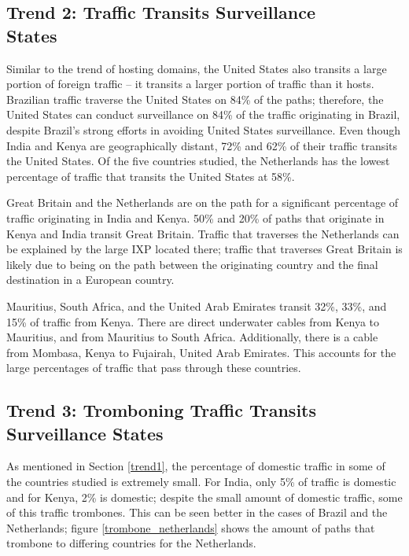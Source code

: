 \subsection{Trend 2: Traffic Transits Surveillance \\States}
Similar to the trend of hosting domains, the United States also transits a large portion of foreign traffic -- it transits a larger portion of traffic than it hosts.  Brazilian traffic traverse the United States on 84\% of the paths; therefore, the United States can conduct surveillance on 84\% of the traffic originating in Brazil, despite Brazil's strong efforts in avoiding United States surveillance.  Even though India and Kenya are geographically distant, 72\% and 62\% of their traffic transits the United States.  Of the five countries studied, the Netherlands has the lowest percentage of traffic that transits the United States at 58\%.  

Great Britain and the Netherlands are on the path for a significant percentage of traffic originating in India and Kenya.  50\% and 20\% of paths that originate in Kenya and India transit Great Britain.  Traffic that traverses the Netherlands can be explained by the large IXP located there; traffic that traverses Great Britain is likely due to being on the path between the originating country and the final destination in a European country.

Mauritius, South Africa, and the United Arab Emirates transit 32\%, 33\%, and 15\% of traffic from Kenya.  There are direct underwater cables from Kenya to Mauritius, and from Mauritius to South Africa.  Additionally, there is a cable from Mombasa, Kenya to Fujairah, United Arab Emirates.  This accounts for the large percentages of traffic that pass through these countries.

\subsection{Trend 3: Tromboning Traffic Transits \\Surveillance States}

As mentioned in Section \ref{trend1}, the percentage of domestic traffic in some of the countries studied is extremely small.  For India, only 5\% of traffic is domestic and for Kenya, 2\% is domestic; despite the small amount of domestic traffic, some of this traffic trombones.  This can be seen better in the cases of Brazil and the Netherlands; figure \ref{trombone_netherlands} shows the amount of paths that trombone to differing countries for the Netherlands.

